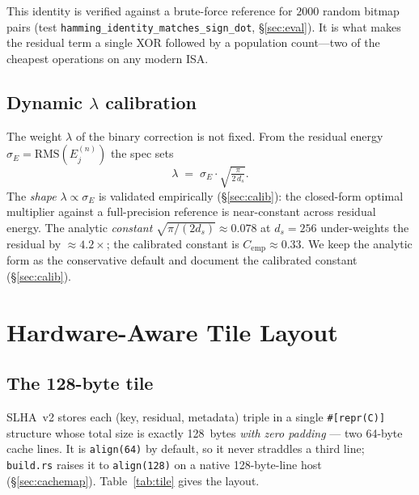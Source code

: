 \documentclass[11pt]{article}
\theoremstyle{plain}
\theoremstyle{definition}
\newcommand{\ds}{d_s}
\newcommand{\sigE}{\sigma_E}
\newcommand{\rms}{\mathrm{RMS}}
\begin{document}
This identity is verified against a brute-force reference for $2000$
random bitmap pairs (test \texttt{hamming\_identity\_matches\_sign\_dot},
\S\ref{sec:eval}). It is what makes the residual term a single XOR
followed by a population count---two of the cheapest operations on any
modern ISA.

\subsection{Dynamic $\lambda$ calibration}
\label{sec:lambda}
The weight $\lambda$ of the binary correction is not fixed. From the
residual energy $\sigE = \rms(E_j^{(n)})$ the spec sets
\begin{equation}
  \lambda \;=\; \sigE \cdot \sqrt{\tfrac{\pi}{2\,\ds}}.
  \label{eq:lambda}
\end{equation}
The \emph{shape} $\lambda \propto \sigE$ is validated empirically
(\S\ref{sec:calib}): the closed-form optimal multiplier against a
full-precision reference is near-constant across residual energy. The
analytic \emph{constant} $\sqrt{\pi/(2\ds)} \approx 0.078$ at $\ds=256$
under-weights the residual by $\approx 4.2\times$; the calibrated
constant is $C_{\text{emp}} \approx 0.33$. We keep the analytic form as
the conservative default and document the calibrated constant
(\S\ref{sec:calib}).

\section{Hardware-Aware Tile Layout}
\label{sec:tile}

\subsection{The 128-byte tile}
SLHA~v2 stores each (key, residual, metadata) triple in a single
\texttt{\#[repr(C)]} structure whose total size is exactly 128~bytes
\emph{with zero padding} --- two 64-byte cache lines. It is \texttt{align(64)}
by default, so it never straddles a third line; \texttt{build.rs} raises it to
\texttt{align(128)} on a native 128-byte-line host (\S\ref{sec:cachemap}).
Table~\ref{tab:tile} gives the layout.
\end{document}
